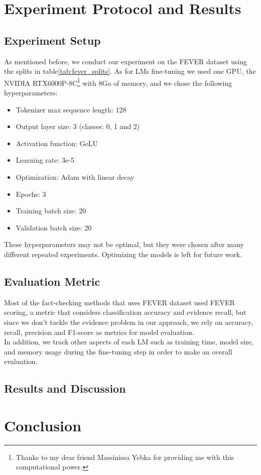 \documentclass[conference]{IEEEtran}
\begin{document}
\section{Experiment Protocol and Results}
\subsection{Experiment Setup}
As mentioned before, we conduct our experiment on the FEVER dataset using the splits in table\ref{tab:fever_splits}. As for LMs fine-tuning we used one GPU, the NVIDIA RTX6000P-8C\footnote{Thanks to my dear friend Massinissa Yebka for providing me with this computational power.} with 8Go of memory, and we chose the following hyperparameters:
\begin{itemize}
\item Tokenizer max sequence length: 128
\item Output layer size: 3 (classes: 0, 1 and 2)
\item Activation function: GeLU
\item Learning rate: 3e-5
\item Optimization: Adam with linear decay
\item Epochs: 3
\item Training batch size: 20
\item Validation batch size: 20\\
\end{itemize}

These hyperparameters may not be optimal, but they were chosen after many different repeated experiments. Optimizing the models is left for future work.
\subsection{Evaluation Metric}
Most of the fact-checking methods that uses FEVER dataset used FEVER scoring, a metric that considers classification accuracy and evidence recall, but since we don't tackle the evidence problem in our approach, we rely on accuracy, recall, precision and F1-score as metrics for model evaluation.\\
In addition, we track other aspects of each LM such as training time, model size, and memory usage during the fine-tuning step in order to make an overall evaluation. 
\subsection{Results and Discussion}


\section{Conclusion}





\end{document}
